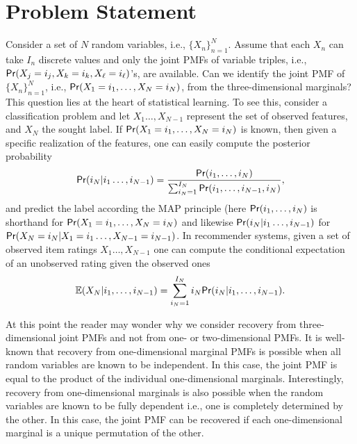 \documentclass[journal]{IEEEtran}
\begin{document}
\section{Problem Statement}
\label{sec:pr_statement}
Consider a set of $N$ random variables, i.e., $\{X_n\}_{n=1}^N$. Assume that each $X_n$ can take $I_n$ discrete values and only the joint PMFs of variable triples, i.e., ${\sf Pr}(X_j=i_j,X_k=i_k,X_\ell=i_\ell)$'s, are available. Can we identify the joint PMF of $\{X_n\}_{n=1}^N$, i.e., ${\sf Pr}(X_1=i_1,\ldots,X_N=i_N) $, from the { three-dimensional} marginals? This question lies at the heart of statistical learning. To see this, consider a classification problem and  let $X_1\ldots,X_{N-1}$ represent the set of observed features, and $X_N$ the sought label. If ${\sf Pr}(X_1=i_1,\ldots,X_N=i_N) $ is known, then given a specific realization of the features, one can easily compute the posterior probability 
\[{\sf Pr}(i_N | i_1 \ldots, i_{N-1})=\frac{{\sf Pr}(i_1,\ldots,i_N)}{ \sum_{i_N=1}^{I_N}{\sf Pr}(i_1,\ldots,i_{N-1},i_N)},\]
and predict the label according the MAP principle (here ${\sf Pr}(i_1,\ldots,i_N)$ is shorthand for ${\sf Pr}(X_1=i_1,\ldots,X_N=i_N) $ and likewise ${\sf Pr}(i_N | i_1 \ldots, i_{N-1})$ for ${\sf Pr}(X_N=i_N | X_1=i_1 \ldots, X_{N-1}=i_{N-1})$.
In recommender systems, given a set of observed item ratings $X_1\ldots,X_{N-1}$ one can compute the conditional expectation of an unobserved rating given the observed ones
\[ {\mathbb E} ( X_N | i_1,\ldots,i_{N-1})  = \sum_{i_N = 1}^{I_N} i_N {\sf Pr}(i_N | i_1,\ldots,i_{N-1} ).\]

At this point the reader may wonder why we consider recovery from { three-dimensional} joint PMFs and not from {one- or two-dimensional} PMFs. It is well-known that recovery from { one-dimensional} marginal PMFs is  possible when all random variables are {known to be} independent. {In this case, the joint PMF is equal to the product of the individual one-dimensional marginals. Interestingly, recovery from one-dimensional marginals is also possible when the random variables are known to be fully dependent i.e., one is completely determined by the other. In this case, the joint PMF can be recovered if each one-dimensional marginal is a unique permutation of the other.} 
\end{document}
